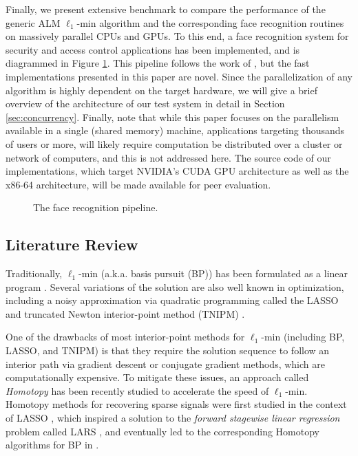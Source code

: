 \documentclass[10pt,twocolumn,letterpaper]{article}
\begin{document}
Finally, we present extensive benchmark to compare the performance of the
generic ALM $\ell_1$-min algorithm and the corresponding face recognition
routines on massively parallel CPUs and GPUs.  To this end, a face
recognition system for security and access control applications has been implemented, 
and is diagrammed in Figure \ref{fig:pipeline}. This pipeline follows the work of \cite{WagnerA2011-PAMI}, but
the fast implementations presented in this paper are novel.
Since the parallelization of any algorithm
is highly dependent on the target hardware, we will give a brief overview of
the architecture of our test system in detail in Section
\ref{sec:concurrency}.
Finally, note that 
while this paper focuses on the parallelism available in a single (shared memory) machine,
applications targeting thousands of users or more, will likely require computation be
distributed over a cluster or network of computers, and this is not addressed here.
The source code of our implementations, which target NVIDIA's CUDA GPU architecture
as well as the x86-64 architecture, will be made available for peer evaluation.
\begin{figure}
\centering
{\tiny }
\caption{The face recognition pipeline.}
\label{fig:pipeline}
\end{figure}

\subsection{Literature Review} 
Traditionally, $\ell_1$-min (a.k.a.
basis pursuit (BP)) has been formulated as a linear program
\cite{ChenS2001-SIAM}. Several variations of the solution are also well known
in optimization, including a noisy approximation via quadratic programming
called the LASSO \cite{TibshiraniR1996} and truncated Newton interior-point
method (TNIPM) \cite{KimS2007}.

One of the drawbacks of most interior-point methods for $\ell_1$-min (including
BP, LASSO, and TNIPM) is that they require the solution sequence to follow an
interior path via gradient descent or conjugate gradient methods, which are computationally expensive.
To mitigate these issues, an approach called \emph{Homotopy} has been recently studied to accelerate the
speed of $\ell_1$-min. Homotopy methods for recovering sparse signals were
first studied in the context of LASSO \cite{OsborneM2000}, which inspired a
solution to the \emph{forward stagewise linear regression} problem called LARS
\cite{EfronB2004}, and eventually led to the corresponding Homotopy algorithms
for BP in \cite{MalioutovD2005,DonohoD2006}.
\end{document}
